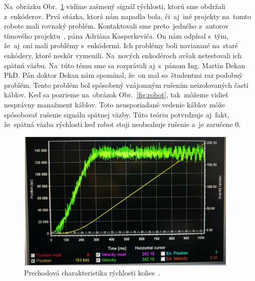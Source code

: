 Na~obrázku Obr.~\ref{fig:prechChar} vidíme zašmený signál rýchlosti, ktorú sme obdržali z~enkóderov. Prvá
otázka, ktorá nám napadla bola, či~aj~iné projekty na~tomto robote mali rovnaký problém. Kontaktovali
sme preto~jedného z~autorov tímového projektu~\cite{timovyProjekt}, pána Adriána Kasperkeviča. On nám odpísal s~tým,
že~aj~oni mali problémy s~enkódermi. Ich problémy boli naviazané na~staré enkódery, ktoré neskôr
vymenili. Na~nových enkodéroch avšak netestovali ich spätnú väzbu. Na~túto tému sme sa rozprávali
aj~s~pánom Ing. Martin Dekan PhD. Pán doktor Dekan nám spomínal, že~on mal so~študentmi raz podobný
problém. Tento problém bol spôsobený vzájomným rušením neizolovaných častí káblov. Keď sa pozrieme
na~obrázok Obr.~\ref{fig:robot}, tak~môžeme vidieť nesprávny manažment káblov. Toto neusporiadané vedenie káblov môže
spôsobovať rušenie signálu spätnej väzby. Túto teóriu potvrdzuje aj~fakt, že~spätná väzba rýchlosti
keď robot stoji neobsahuje rušenie a~je zaručene 0.

\begin{figure}[!htbp]
	\begin{center}
		\includegraphics[width=0.95\textwidth]{img/robotSpeedChar.png}
	\end{center}
	\caption{Prechodová charakteristika rýchlosti kolies~\cite{timovyProjekt}. }
	\label{fig:prechChar}
\end{figure}

\clearpage
